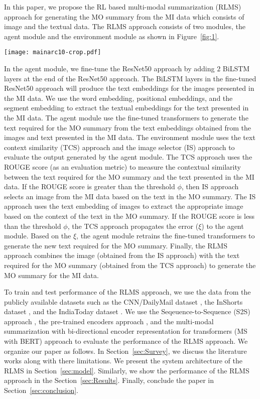 \documentclass[preprint,review,12pt]{elsarticle}
\begin{document}
In this paper, we propose the RL based multi-modal summarization (RLMS) approach for generating the MO summary from the MI data which consists of image and the textual data. The RLMS approach consists of two modules, the agent module and the environment module as shown in Figure~\ref{fig:1}. 
\begin{figure*}[h!]
	\centering
	\texttt{[image: mainarc10-crop.pdf]}
	\caption{System Architecture of the RLMS approach.} 
	\label{fig:1}
\end{figure*}
In the agent module, we fine-tune the ResNet50 approach by adding $2$ BiLSTM layers at the end of the ResNet50 approach. The BiLSTM layers in the fine-tuned ResNet50 approach will produce the text embeddings for the images presented in the MI data. We use the word embedding, positional embeddings, and the segment embedding to extract the textual embeddings for the text presented in the MI data. The agent module use the fine-tuned transformers to generate the text required for the MO summary from the text embeddings obtained from the images and text presented in the MI data. The environment module uses the text context similarity (TCS) approach and the image selector (IS) approach to evaluate the output generated by the agent module. The TCS approach uses the ROUGE score (as an evaluation metric) to measure the contextual similarity between the text required for the MO summary and the text presented in the MI data. If the ROUGE score is greater than the threshold $\phi$, then IS approach selects an image from the MI data based on the text in the MO summary. The IS approach uses the text embedding of images to extract the appropriate image based on the context of the text in the MO summary. If the ROUGE score is less than the threshold $\phi$, the TCS approach propagates the error ($\xi$) to the agent module. Based on the $\xi$, the agent module retrains the fine-tuned transformers to generate the new text required for the MO summary. Finally, the RLMS approach combines the image (obtained from the IS approach) with the text required for the MO summary (obtained from the TCS approach) to generate the MO summary for the MI data. 

To train and test performance of the RLMS approach, we use the data from the publicly available datasets such as the CNN/DailyMail dataset \cite{19}, the InShorts dataset \cite{20}, and the IndiaToday dataset \cite{21}. We use the Seqeuence-to-Sequence (S2S) approach \cite{}, the pre-trained encoders approach \cite{}, and the multi-modal summarization with bi-directional encoder representation for transformers (MS with BERT) approach \cite{} to evaluate the performance of the RLMS approach. We organize our paper as follows. In Section~\ref{sec:Survey}, we discuss the literature works along with there limitations. We present the system architecture of the RLMS in Section~\ref{sec:model}. Similarly, we show the performance of the RLMS approach in the Section~\ref{sec:Results}. Finally, conclude the paper in Section~\ref{sec:conclusion}.  
	
\end{document}
